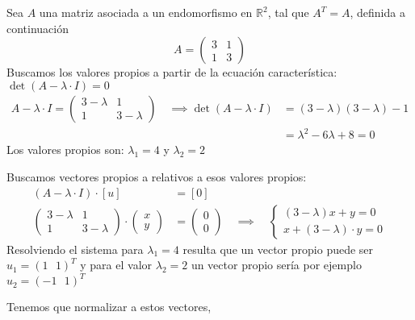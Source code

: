 \ejemplo

Sea \(A\) una matriz asociada a un endomorfismo en \(\mathbb{R}^2\), tal que \(A^T = A\), definida a continuación
\[
  A = \begin{pmatrix}
    3 & 1 \\
    1 & 3
  \end{pmatrix}
\]
Buscamos los valores propios a partir de la ecuación característica: \(\det (A - \lambda \cdot I) = 0\)
\begin{align*}
A - \lambda \cdot I = \begin{pmatrix}
  3-\lambda & 1 \\
  1 & 3-\lambda
\end{pmatrix} \quad \implies \det (A-\lambda \cdot I) &= (3-\lambda)(3-\lambda)-1\\
&= \lambda^2 -6\lambda + 8 = 0
\end{align*}
Los valores propios son: \(\lambda_1 = 4\) y \(\lambda_2=2\)

Buscamos vectores propios a relativos a esos valores propios:
\begin{align*}
  (A-\lambda \cdot I) \cdot [u] &= [0] \\
  \begin{pmatrix}
    3-\lambda & 1 \\
    1 & 3-\lambda
  \end{pmatrix} \cdot \begin{pmatrix}
    x\\ y
  \end{pmatrix} &= \begin{pmatrix}
    0 \\ 0
  \end{pmatrix} \quad \implies \quad \begin{cases}
    (3-\lambda)x + y =0\\
    x +(3-\lambda) \cdot y = 0
  \end{cases} 
\end{align*}
Resolviendo el sistema para \(\lambda_1 = 4\) resulta que un vector propio puede ser \(u_1 = (1 ~~~ 1)^T\) y para el valor \(\lambda_2 = 2\) un vector propio sería por ejemplo \(u_2 = (-1 ~~~ 1)^T\)

Tenemos que normalizar a estos vectores, 